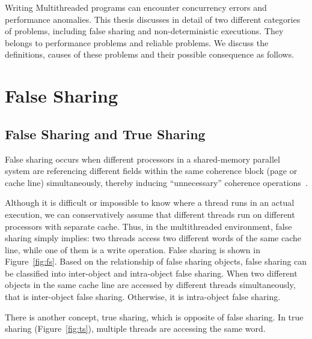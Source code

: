 \label{chapter:problems}

Writing Multithreaded programs can encounter concurrency errors and performance anomalies. This thesis discusses in detail of two different categories of problems, including false sharing and non-deterministic executions. They belongs to performance problems and reliable problems. We discuss the definitions, causes of these problems and their possible consequence as follows.

\section{False Sharing}

\subsection{False Sharing and True Sharing}
False sharing occurs when different processors in a shared-memory parallel system are referencing different fields within the same coherence block (page or cache line) simultaneously, thereby inducing ``unnecessary'' coherence operations~\cite{Bolosky:1993:FSE:1295480.1295483}. 

Although it is difficult or impossible to know where a thread runs in an actual execution, we can conservatively assume that different threads run on different processors with separate cache. Thus, in the multithreaded environment, false sharing simply implies: two threads access two different words of the same cache line, while one of them is a write operation. False sharing is shown in Figure~\ref{fig:fs}. 
Based on the relationship of false sharing objects, 
false sharing can be classified into inter-object and intra-object false sharing. When two different objects in the same cache line are accessed by different threads simultaneously, that is inter-object false sharing. Otherwise, it is intra-object false sharing. 

There is another concept, true sharing, which is opposite of false sharing. In true sharing (Figure~\ref{fig:ts}), multiple threads are accessing the same word. 

